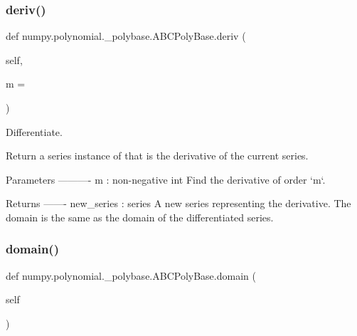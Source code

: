 \subsubsection{\texorpdfstring{deriv()}{deriv()}}
{\footnotesize\ttfamily def numpy.\+polynomial.\+\_\+polybase.\+A\+B\+C\+Poly\+Base.\+deriv (\begin{DoxyParamCaption}\item[{}]{self,  }\item[{}]{m = {} }\end{DoxyParamCaption})}

\begin{DoxyVerb}Differentiate.

Return a series instance of that is the derivative of the current
series.

Parameters
----------
m : non-negative int
    Find the derivative of order `m`.

Returns
-------
new_series : series
    A new series representing the derivative. The domain is the same
    as the domain of the differentiated series.\end{DoxyVerb}
 \mbox{\label{classnumpy_1_1polynomial_1_1__polybase_1_1ABCPolyBase_ae12c8836059cacb9c60e4831c5dc5fc4}} 
\subsubsection{\texorpdfstring{domain()}{domain()}}
{\footnotesize\ttfamily def numpy.\+polynomial.\+\_\+polybase.\+A\+B\+C\+Poly\+Base.\+domain (\begin{DoxyParamCaption}\item[{}]{self }\end{DoxyParamCaption})}

\mbox{\label{classnumpy_1_1polynomial_1_1__polybase_1_1ABCPolyBase_afb8f322ca5380c3ac0cfb00d7b9926a2}} 
